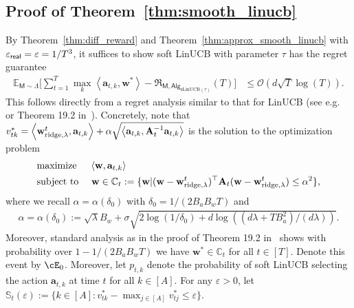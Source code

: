 \documentclass[10pt]{article}
\renewcommand{\epsilon}{\varepsilon}
\newcommand{\eps}{\varepsilon}
\renewcommand{\cO}{\mathcal{O}}
\newcommand{\<}{\left\langle}
\renewcommand{\>}{\right\rangle}
\newcommand{\ridge}{{\rm ridge}}
\newcommand{\E}{\mathbb{E}}
\newcommand{\inst}{{\mathsf{M}}}
\newcommand{\sLinUCB}{{\mathrm{sLinUCB}}}
\newcommand{\temp}{{\tau}}
\newcommand{\cwid}{{\alpha}}  %
\newcommand{\totlen}{{T}} %
\newcommand{\sAlg}{{\mathsf{Alg}}}
\newcommand{\prior}{{\Lambda}}
\newcommand{\geneps}{{\epsilon}_{\sf real}}
\newcommand{\totreward}{{\mathfrak{R}}}  %
\def\sC{{\mathbb{C}}}
\def\sS{{\mathbb{S}}}
\def\bA{{\mathbf A}}
\def\ba{{\mathbf a}}
\def\bw{{\mathbf w}}
\begin{document}
\subsection{Proof of Theorem~\ref{thm:smooth_linucb}}\label{sec:pf_thm:smooth_linucb}

By Theorem~\ref{thm:diff_reward} and Theorem~\ref{thm:approx_smooth_linucb} with ${\geneps=\eps=1/\totlen^3}$, it suffices to show soft LinUCB with parameter $\temp$ has the regret guarantee \begin{align*}
\E_{\inst\sim\prior}\Big[\sum_{t=1}^\totlen\max_{k}\<\ba_{t,k},\bw^*\>-\totreward_{\inst,\sAlg_{\sLinUCB(\temp)}}(\totlen)\Big]&\leq\cO(d\sqrt{T}\log(T)).
\end{align*}
This follows directly from a  regret analysis similar to  that for LinUCB (see e.g.~\cite{chu2011contextual} or  Theorem 19.2 in~\cite{lattimore2020bandit}). Concretely, note that $v_{tk}^*=\<\bw^t_{\ridge,\lambda},\ba_{t,k}\>+\alpha\sqrt{\<\ba_{t,k}, {\bA_t^{-1} \ba_{t,k}}\>}$ is the solution to the optimization problem 
\begin{align*}&\text{maximize }~~~\<\bw,\ba_{t,k}\>
\\
&\text{subject to }~~~\bw\in \sC_t:=\{\bw|(\bw-\bw^t_{\ridge,\lambda})^\top\bA_t(\bw-\bw^t_{\ridge,\lambda})\leq\alpha^2\},
\end{align*}
where we recall $\alpha=\alpha(\delta_0)$ with $\delta_0=1/(2B_aB_wT)$ and
\begin{align}
\cwid=\cwid(\delta_0):=\sqrt{\lambda}B_w+\sigma\sqrt{2\log(1/\delta_0)+d\log((d\lambda+TB_a^2)/(d\lambda))}.\label{eq:recall_alpha_formula}
\end{align}
Moreover, standard analysis as in the proof of Theorem 19.2 in~\cite{lattimore2020bandit} shows with probability over $1-1/(2B_aB_wT)$ we have $\bw^*\in\sC_t$ for all $t\in[T]$. Denote this event by $\cE_0$. Moreover, let $p_{t,k}$ denote the probability of soft LinUCB selecting the action $\ba_{t,k}$ at time $t$ for all $k\in[A]$.  For any $\eps>0$, let $\sS_t(\eps):=\{k\in[A]:v^*_{tk}-\max_{j\in[A]}v^*_{tj}\leq \eps\}$. 
\end{document}
